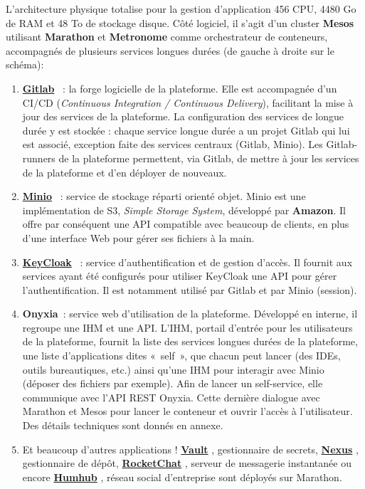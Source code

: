 L'architecture physique totalise pour la gestion d'application 456 CPU, 4480 Go de RAM et 48 To de stockage disque. Côté logiciel, il s'agit d'un cluster \textbf{Mesos} utilisant \textbf{Marathon} et \textbf{Metronome} comme orchestrateur de conteneurs, accompagnés de plusieurs services longues durées (de gauche à droite sur le schéma):
\begin{enumerate}
    \item \href{https://about.gitlab.com/}{\textbf{Gitlab}} \cite{gitlab}~: la forge logicielle de la plateforme. Elle est accompagnée d'un CI/CD (\textit{Continuous Integration / Continuous Delivery}), facilitant la mise à jour des services de la plateforme. La configuration des services de longue durée y est stockée : chaque service longue durée a un projet Gitlab qui lui est associé, exception faite des services centraux (Gitlab, Minio). Les Gitlab-runners de la plateforme permettent, via Gitlab, de mettre à jour les services de la plateforme et d'en déployer de nouveaux.
    \vspace{5pt}
    \item \href{https://min.io/}{\textbf{Minio}} \cite{minio}~: service de stockage réparti orienté objet. Minio est une implémentation de S3, \textit{Simple Storage System}, développé par \textbf{Amazon}. Il offre par conséquent une API compatible avec beaucoup de clients, en plus d'une interface Web pour gérer ses fichiers à la main.
    \vspace{5pt}
    \item \href{https://www.keycloak.org/}{\textbf{KeyCloak}} \cite{keycloak}~: service d'authentification et de gestion d'accès. Il fournit aux services ayant été configurés pour utiliser KeyCloak une API pour gérer l'authentification. Il est notamment utilisé par Gitlab et par Minio (session).
    \vspace{5pt}
    \item \textbf{Onyxia}~: service web d'utilisation de la plateforme. Développé en interne, il regroupe une IHM et une API. L'IHM, portail d'entrée pour les utilisateurs de la plateforme, fournit la liste des services longues durées de la plateforme, une liste d'applications dites «~self~», que chacun peut lancer (des IDEs, outils bureautiques, etc.) ainsi qu'une IHM pour interagir avec Minio (déposer des fichiers par exemple). Afin de lancer un self-service, elle communique avec l'API REST Onyxia. Cette dernière dialogue avec Marathon et Mesos pour lancer le conteneur et ouvrir l'accès à l'utilisateur. Des détails techniques sont donnés en annexe.
    \vspace{5pt}
    \item Et beaucoup d'autres applications ! \href{https://www.vaultproject.io/}{\textbf{Vault}} \cite{vault}, gestionnaire de secrets, \href{https://fr.sonatype.com/nexus-repository-sonatype}{\textbf{Nexus}} \cite{nexus}, gestionnaire de dépôt, \href{https://rocket.chat/}{\textbf{RocketChat}} \cite{rocketchat}, serveur de messagerie instantanée ou encore \href{https://humhub.org}{\textbf{Humhub}} \cite{humhub}, réseau social d'entreprise sont déployés sur Marathon.
    \newline
\end{enumerate}

